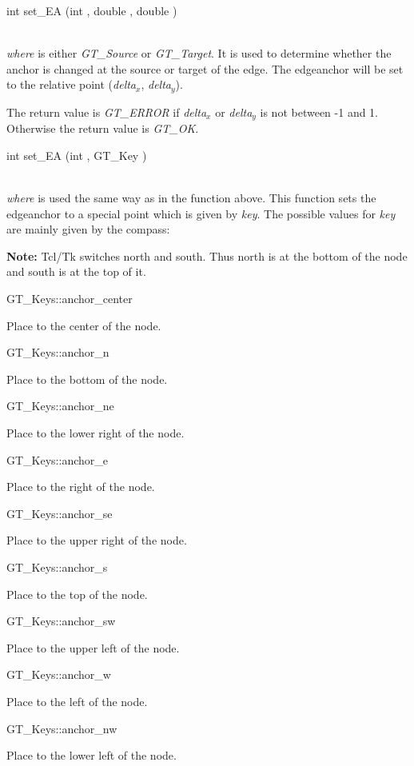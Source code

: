 \documentclass[twoside,fleqn]{report}
\begin{document}
\begin{Cdefinition}

  \item[int set\_EA (int \Param{where}, 
    double \Param{delta$_x$}, double \Param{delta$_y$})] \strut \\
    \emph{where} is either \emph{GT\_Source} or \emph{GT\_Target}. 
    It is used to determine whether the anchor is changed at the 
    source or target of the edge.
    The edgeanchor will be set to the relative point 
    (\emph{delta$_x$}, \emph{delta$_y$}).

    The return value is \emph{GT\_ERROR} if \emph{delta$_x$} or 
    \emph{delta$_y$} is not between -1 and 1.
    Otherwise the return value is \emph{GT\_OK}.

  \item[int set\_EA (int \Param{where}, GT\_Key \Param{key})] \strut \\
    \emph{where} is used the same way as in the function above. 
    This function sets the edgeanchor to a special point which is given by 
    \emph{key}. The possible values for \emph{key} are mainly given by the 
    compass:

    \textbf{Note:} Tcl/Tk switches north and south.
    Thus north is at the bottom of the node and south is at the top of it.
  
    \begin{ttdescription}
    \item[GT\_Keys::anchor\_center] \strut
      Place to the center of the node.
    \item[GT\_Keys::anchor\_n] \strut
      Place to the bottom of the node.
    \item[GT\_Keys::anchor\_ne] \strut
      Place to the lower right of the node.
    \item[GT\_Keys::anchor\_e] \strut
      Place to the right of the node.
    \item[GT\_Keys::anchor\_se] \strut
      Place to the upper right of the node.
    \item[GT\_Keys::anchor\_s] \strut
      Place to the top of the node.
    \item[GT\_Keys::anchor\_sw] \strut
      Place to the upper left of the node.
    \item[GT\_Keys::anchor\_w] \strut
     Place to the left of the node.
    \item[GT\_Keys::anchor\_nw] \strut
      Place to the lower left of the node.
    \end{ttdescription}


\end{Cdefinition}
\end{document}
